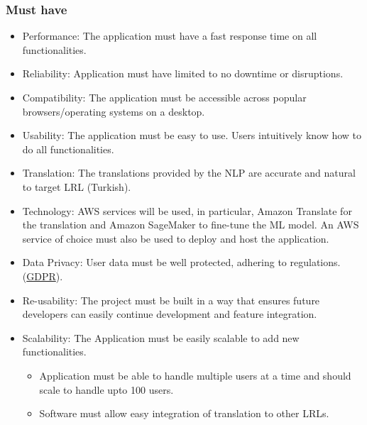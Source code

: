 \subsubsection*{Must have}
\begin{itemize}
\item Performance: The application must have a fast response time on all functionalities.
\item Reliability: Application must have limited to no downtime or disruptions.
\item Compatibility: The application must be accessible across popular browsers/operating systems on a desktop.
\item Usability: The application must be easy to use. Users intuitively know how to do all functionalities.
\item Translation: The translations provided by the \acrshort{NLP} are accurate and natural to target \acrshort{LRL} (Turkish).

\item Technology: AWS services will be used, in particular, Amazon Translate for the translation and Amazon SageMaker to fine-tune the ML model. An AWS service of choice must also be used to deploy and host the application. 
\item Data Privacy: User data must be well protected, adhering to regulations. (\href{https://gdpr-info.eu/}{GDPR}).
\item Re-usability: The project must be built in a way that ensures future developers can easily continue development and feature integration.
\item Scalability: The Application must be easily scalable to add new functionalities.
\begin{itemize}
\item Application must be able to handle multiple users at a time and should scale to handle upto 100 users.
\item Software must allow easy integration of translation to other \acrshort{LRL}s.
\end{itemize}

\end{itemize}

